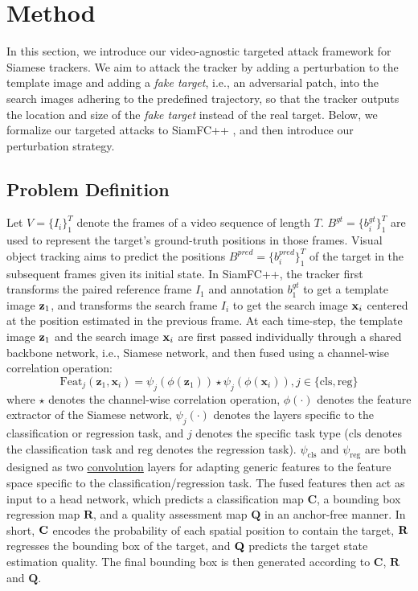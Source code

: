\documentclass[journal]{IEEEtran}
\newcommand{\ie}{i.e.}
\begin{document}
\section{Method}\label{method}

In this section, we introduce our video-agnostic targeted attack framework for Siamese trackers. We aim to attack the tracker by adding a perturbation to the template image and adding a \textit{fake target}, i.e., an adversarial patch, into the search images adhering to the predefined trajectory, so that the tracker outputs the location and size of the \textit{fake target} instead of the real target. Below, we formalize our targeted attacks to SiamFC++ \cite{SiamFC++}, and then introduce our perturbation strategy.
\vspace{-5mm}
 
\subsection{Problem Definition}\label{problemdefinition}

Let $V=\{I_i\}_1^T$ denote the frames of a video sequence of length $T$. $B^{gt}=\{b^{gt}_i\}_1^T$ are used to represent the target's ground-truth positions in those frames. Visual object tracking aims to predict the positions $B^{pred}=\{b^{pred}_i\}_1^T$ of the target in the subsequent frames given its initial state. In SiamFC++, the tracker first transforms the paired reference frame $I_1$ and annotation $b_1^{gt}$ to get a template image $\textbf z_1$, and transforms the search frame $I_i$ to get the search image $\textbf x_i$ centered at the position estimated in the previous frame. At each time-step, the template image $\textbf z_1$ and the search image $\textbf x_i$ are first passed individually through a shared backbone network, \ie, Siamese network, and then fused using a channel-wise correlation operation:
\begin{equation}
  \text{Feat}_{j}(\mathbf{z}_1, \mathbf{x}_i)=\psi_{j}(\phi(\mathbf{z}_1)) \star \psi_{j}(\phi(\mathbf{x}_i)), j \in\{\mathrm{cls}, \mathrm{reg}\}
\end{equation}
where $\star$ denotes the channel-wise correlation operation, $\phi(\cdot)$ denotes the feature extractor of the Siamese network, $\psi_j(\cdot)$ denotes the layers specific to the classification or regression task, and $j$ denotes the specific task type ($\mathrm{cls}$ denotes the classification task and $\mathrm{reg}$ denotes the regression task). $\psi_{\mathrm{cls}}$ and $\psi_{\mathrm{reg}}$ are both designed as two \uline{convolution} layers for adapting generic features to the feature space specific to the classification/regression task. The fused features then act as input to a head network, which predicts a classification map $\textbf{C}$, a bounding box regression map $\textbf{R}$, and a quality assessment map $\textbf{Q}$ in an anchor-free manner. In short, $\textbf C$ encodes the probability of each spatial position to contain the target, $\textbf R$ regresses the bounding box of the target, and $\textbf Q$ predicts the target state estimation quality. The final bounding box is then generated according to $\textbf{C}$, $\textbf{R}$ and $\textbf{Q}$.
\end{document}
